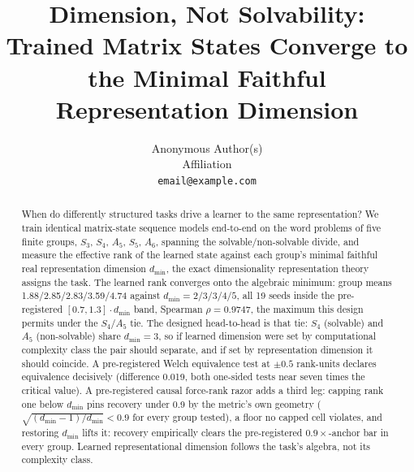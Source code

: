 \documentclass{article}
\title{Dimension, Not Solvability: Trained Matrix States Converge to the
Minimal Faithful Representation Dimension}
\author{%
  Anonymous Author(s)\\
  Affiliation\\
  \texttt{email@example.com}
}
\newcommand{\dmin}{d_{\min}}
\begin{document}
\maketitle

\begin{abstract}
When do differently structured tasks drive a learner to the same
representation? We train identical matrix-state sequence models
end-to-end on the word problems of five finite groups, $S_3$, $S_4$,
$A_5$, $S_5$, $A_6$, spanning the solvable/non-solvable divide, and
measure the effective rank of the learned state against each group's
minimal faithful real representation dimension $\dmin$, the exact
dimensionality representation theory assigns the task. The learned rank
converges onto the algebraic minimum: group means
1.88/2.85/2.83/3.59/4.74 against $\dmin = 2/3/3/4/5$, all 19 seeds
inside the pre-registered $[0.7, 1.3] \cdot \dmin$ band, Spearman
$\rho = 0.9747$, the maximum this design permits under the $S_4$/$A_5$
tie.
The designed head-to-head is that tie: $S_4$ (solvable) and $A_5$
(non-solvable) share $\dmin = 3$, so if learned dimension were set by
computational complexity class the pair should separate, and if set by
representation dimension it should coincide. A pre-registered Welch
equivalence test at $\pm 0.5$ rank-units declares equivalence decisively
(difference 0.019, both one-sided tests near seven times the critical
value).
A pre-registered causal force-rank razor adds a third leg:
capping rank one below $\dmin$ pins recovery under 0.9 by the metric's
own geometry ($\sqrt{(\dmin{-}1)/\dmin} < 0.9$ for every group tested),
a floor no capped cell violates, and restoring $\dmin$ lifts it:
recovery empirically clears the pre-registered $0.9\times$-anchor bar
in every group.
Learned
representational dimension follows the task's algebra, not its
complexity class.
\end{abstract}












\end{document}
